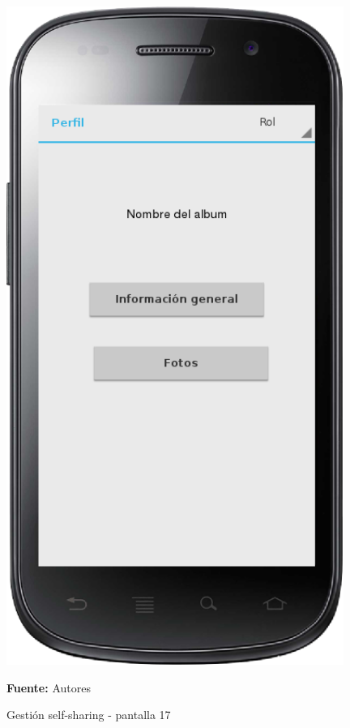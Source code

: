 \begin{figure}[!htb]
  \begin{center}
    \includegraphics[width=11cm]{./imagenes/UI/Self_sharing/self_sharing_17.png}
    \caption{Gestión self-sharing - pantalla 17}
    \label{fig:self_sharing_17}
    \textbf{Fuente:}  Autores
  \end{center}
\end{figure}

